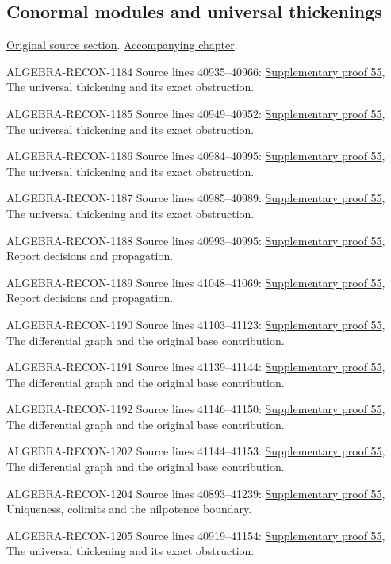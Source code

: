 \subsection{Conormal modules and universal thickenings}
\hypertarget{algebra-source-section-conormal}{}
\noindent\href{https://github.com/stacks/stacks-project/blob/a04446e57ec1fbc252a871afcec7752fb2807b14/algebra.tex\#L40911}{Original source section}. \href{algebra.pdf\#nameddest=section-conormal}{Accompanying chapter}.

\begin{AlgebraSourceRoutes}
\item[ALGEBRA-RECON-1184] Source lines 40935--40966: \hyperlink{algebra_conormal_thickening_notes_20260928}{Supplementary proof 55}, The universal thickening and its exact obstruction.
\item[ALGEBRA-RECON-1185] Source lines 40949--40952: \hyperlink{algebra_conormal_thickening_notes_20260928}{Supplementary proof 55}, The universal thickening and its exact obstruction.
\item[ALGEBRA-RECON-1186] Source lines 40984--40995: \hyperlink{algebra_conormal_thickening_notes_20260928}{Supplementary proof 55}, The universal thickening and its exact obstruction.
\item[ALGEBRA-RECON-1187] Source lines 40985--40989: \hyperlink{algebra_conormal_thickening_notes_20260928}{Supplementary proof 55}, The universal thickening and its exact obstruction.
\item[ALGEBRA-RECON-1188] Source lines 40993--40995: \hyperlink{algebra_conormal_thickening_notes_20260928}{Supplementary proof 55}, Report decisions and propagation.
\item[ALGEBRA-RECON-1189] Source lines 41048--41069: \hyperlink{algebra_conormal_thickening_notes_20260928}{Supplementary proof 55}, Report decisions and propagation.
\item[ALGEBRA-RECON-1190] Source lines 41103--41123: \hyperlink{algebra_conormal_thickening_notes_20260928}{Supplementary proof 55}, The differential graph and the original base contribution.
\item[ALGEBRA-RECON-1191] Source lines 41139--41144: \hyperlink{algebra_conormal_thickening_notes_20260928}{Supplementary proof 55}, The differential graph and the original base contribution.
\item[ALGEBRA-RECON-1192] Source lines 41146--41150: \hyperlink{algebra_conormal_thickening_notes_20260928}{Supplementary proof 55}, The differential graph and the original base contribution.
\item[ALGEBRA-RECON-1202] Source lines 41144--41153: \hyperlink{algebra_conormal_thickening_notes_20260928}{Supplementary proof 55}, The differential graph and the original base contribution.
\item[ALGEBRA-RECON-1204] Source lines 40893--41239: \hyperlink{algebra_conormal_thickening_notes_20260928}{Supplementary proof 55}, Uniqueness, colimits and the nilpotence boundary.
\item[ALGEBRA-RECON-1205] Source lines 40919--41154: \hyperlink{algebra_conormal_thickening_notes_20260928}{Supplementary proof 55}, The universal thickening and its exact obstruction.
\end{AlgebraSourceRoutes}

